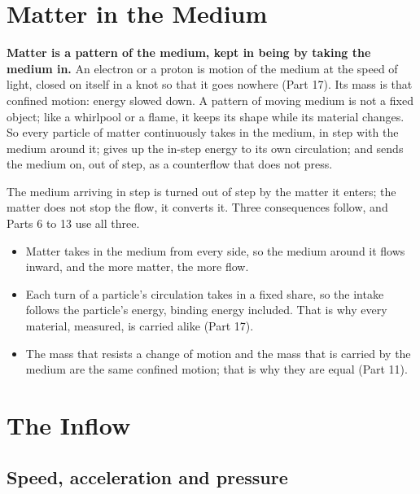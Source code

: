 \section{Matter in the Medium}

\begin{hypbar}
\textbf{Matter is a pattern of the medium, kept in being by taking the medium in.} An electron or a proton is motion of the medium at the speed of light, closed on itself in a knot so that it goes nowhere (Part 17).\footnotemark{} Its mass is that confined motion: energy slowed down. A pattern of moving medium is not a fixed object; like a whirlpool or a flame, it keeps its shape while its material changes. So every particle of matter continuously takes in the medium, in step with the medium around it; gives up the in-step energy to its own circulation; and sends the medium on, out of step, as a counterflow that does not press.
\end{hypbar}

 The medium arriving in step is turned out of step by the matter it enters; the matter does not stop the flow, it converts it. Three consequences follow, and Parts 6 to 13 use all three.
\begin{itemize}
\item {} Matter takes in the medium from every side, so the medium around it flows inward, and the more matter, the more flow.
\item {} Each turn of a particle's circulation takes in a fixed share, so the intake follows the particle's energy, binding energy included. That is why every material, measured, is carried alike (Part 17).
\item {} The mass that resists a change of motion and the mass that is carried by the medium are the same confined motion; that is why they are equal (Part 11).
\end{itemize}

\section{The Inflow}

\subsection{Speed, acceleration and pressure}

